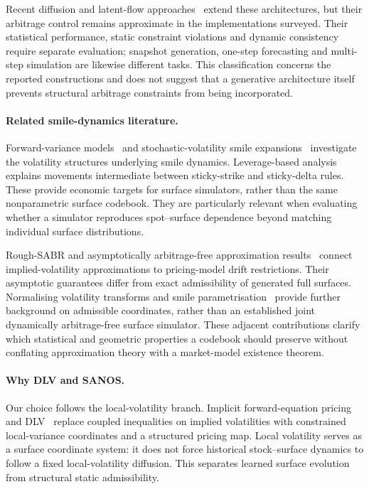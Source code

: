 Recent diffusion and latent-flow approaches~\cite{JinAgarwal2025,BrooksEtAl2026,HaoJi2026,HanEtAl2026,YangWangZhangLi2026} extend these architectures, but their arbitrage
control remains approximate in the implementations surveyed. Their statistical performance,
static constraint violations and dynamic consistency require separate evaluation; snapshot generation,
one-step forecasting and multi-step simulation are likewise different tasks. This classification
concerns the reported constructions and does not suggest that a generative architecture itself
prevents structural arbitrage constraints from being incorporated.

\paragraph{Related smile-dynamics literature.} Forward-variance models~\cite{DysLitBergomi2005,bergomi2008smile} and stochastic-volatility
smile expansions~\cite{bergomi2012stochastic} investigate the volatility structures underlying smile dynamics. Leverage-based
analysis~\cite{DysLitCilibertiBouchaudPotters2008} explains movements intermediate between sticky-strike and sticky-delta rules.
These provide economic targets for surface simulators, rather than the same nonparametric
surface codebook. They are particularly relevant when evaluating whether a simulator reproduces
spot--surface dependence beyond matching individual surface distributions.

Rough-SABR and asymptotically arbitrage-free approximation results~\cite{DysLitFukasawaGatheral2022,DysLitFukasawa2022} connect implied-volatility
approximations to pricing-model drift restrictions. Their asymptotic guarantees differ
from exact admissibility of generated full surfaces. Normalising volatility transforms and smile
parametrisation~\cite{lucic2021normalizing} provide further background on admissible coordinates, rather than an
established joint dynamically arbitrage-free surface simulator. These adjacent contributions
clarify which statistical and geometric properties a codebook should preserve without conflating
approximation theory with a market-model existence theorem.

\paragraph{Why DLV and SANOS.} Our choice follows the local-volatility
branch. Implicit forward-equation pricing~\cite{AndreasenHuge} and DLV~\cite{DLV} replace coupled inequalities on
implied volatilities with constrained local-variance coordinates and a structured pricing map.
Local volatility serves as a surface coordinate system: it does not force historical stock--surface
dynamics to follow a fixed local-volatility diffusion. This separates learned surface evolution from
structural static admissibility.

